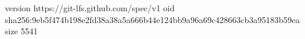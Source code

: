 version https://git-lfs.github.com/spec/v1
oid sha256:9eb5f474b198e2fd38a38a5a666b44e124bb9a96a69c428663cb3a95183b59ea
size 5541
